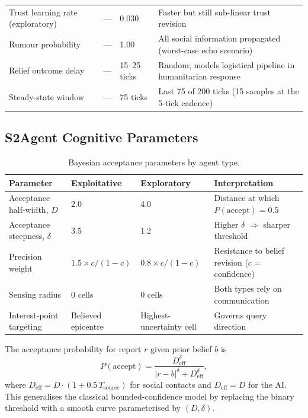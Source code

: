 \begin{table}[h]
\begin{tabular}{llll}
Trust learning rate (exploratory)  & --- & 0.030   & Faster but still sub-linear trust revision \\
Rumour probability          & ---  & 1.00           & All social information propagated (worst-case echo scenario) \\
Relief outcome delay        & ---  & 15--25 ticks   & Random; models logistical pipeline in humanitarian response \\
Steady-state window         & ---  & 75 ticks       & Last 75 of 200 ticks (15 samples at the 5-tick cadence) \\
\bottomrule
\end{tabular}
\end{table}

\subsection*{S2\quad Agent Cognitive Parameters}

\begin{table}[h]
\centering
\caption{Bayesian acceptance parameters by agent type.}
\label{tab:S2}
\small
\begin{tabular}{llll}
\toprule
Parameter & Exploitative & Exploratory & Interpretation \\
\midrule
Acceptance half-width, $D$   & 2.0 & 4.0 & Distance at which $P(\text{accept})=0.5$ \\
Acceptance steepness, $\delta$ & 3.5 & 1.2 & Higher $\delta$ $\Rightarrow$ sharper threshold \\
Precision weight             & $1.5\times c/(1-c)$ & $0.8\times c/(1-c)$ & Resistance to belief revision ($c$ = confidence) \\
Sensing radius               & 0 cells & 0 cells & Both types rely on communication \\
Interest-point targeting     & Believed epicentre & Highest-uncertainty cell & Governs query direction \\
\bottomrule
\end{tabular}
\end{table}

The acceptance probability for report $r$ given prior belief $b$ is
%
\begin{equation}
  P(\text{accept}) = \frac{D_{\mathrm{eff}}^{\delta}}{|r-b|^{\delta}+D_{\mathrm{eff}}^{\delta}},
  \tag{S1}
\end{equation}
%
where $D_{\mathrm{eff}} = D\cdot(1+0.5\,T_{\mathrm{source}})$ for social
contacts and $D_{\mathrm{eff}}=D$ for the AI.
This generalises the classical bounded-confidence model \citep{deffuant2000mixing} by
replacing the binary threshold with a smooth curve parameterised by $(D,\delta)$.

